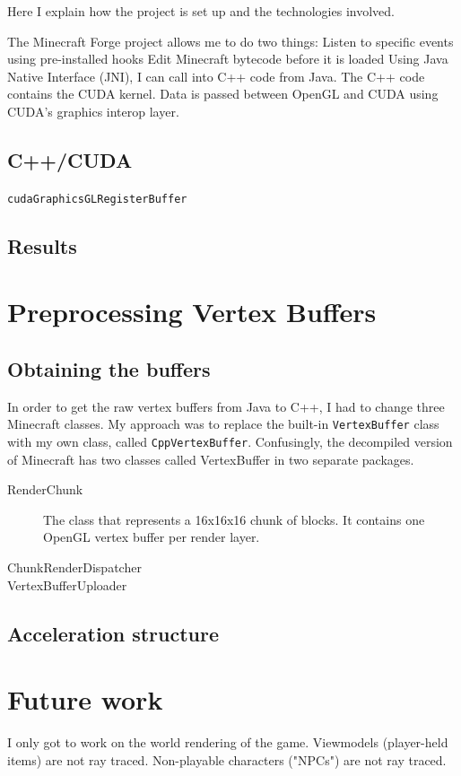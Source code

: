 \documentclass[]{article}
\begin{document}
Here I explain how the project is set up and the technologies involved.

The Minecraft Forge project allows me to do two things:
  Listen to specific events using pre-installed hooks
  Edit Minecraft bytecode before it is loaded
Using Java Native Interface (JNI), I can call into C++ code from Java.
The C++ code contains the CUDA kernel.
Data is passed between OpenGL and CUDA using CUDA's graphics interop layer.

\subsection{C++/CUDA}
\texttt{cudaGraphicsGLRegisterBuffer}

\subsection{Results}



\section{Preprocessing Vertex Buffers}

\subsection{Obtaining the buffers}
In order to get the raw vertex buffers from Java to C++, I had to change three Minecraft classes.
My approach was to replace the built-in \texttt{VertexBuffer} class with my own class, called \texttt{CppVertexBuffer}.
Confusingly, the decompiled version of Minecraft has two classes called VertexBuffer in two separate packages.


\begin{description}
  \item[RenderChunk]
    The class that represents a 16x16x16 chunk of blocks.
    It contains one OpenGL vertex buffer per render layer.
  \item[ChunkRenderDispatcher]
  \item[VertexBufferUploader]
\end{description}

\subsection{Acceleration structure}

\section{Future work}
I only got to work on the world rendering of the game.
Viewmodels (player-held items) are not ray traced.
Non-playable characters ("NPCs") are not ray traced.
\end{document}
